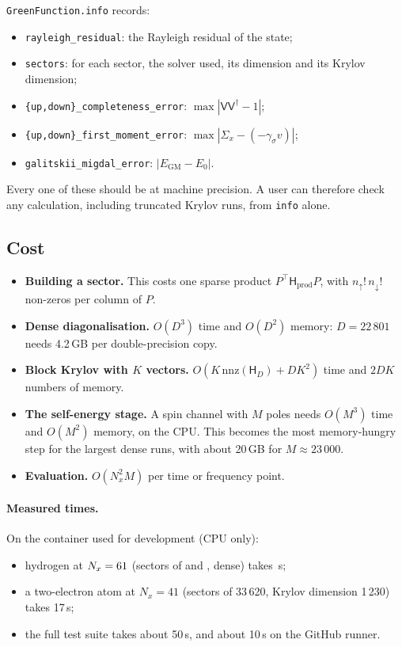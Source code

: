 \documentclass[11pt,a4paper]{article}
\newcommand{\code}[1]{\texttt{#1}}
\newcommand{\mat}[1]{\mathsf{#1}}
\newcommand{\Nx}{N_x}
\newcommand{\up}{{\uparrow}}
\newcommand{\dn}{{\downarrow}}
\begin{document}
\code{GreenFunction.info} records:
\begin{itemize}
\item \code{rayleigh\_residual}: the Rayleigh residual of the state;
\item \code{sectors}: for each sector, the solver used, its dimension and its Krylov dimension;
\item \code{\{up,down\}\_completeness\_error}: $\max|\mat V\mat V^\dagger-1|$;
\item \code{\{up,down\}\_first\_moment\_error}: $\max|\Sigma_x-(-\gamma_\sigma v)|$;
\item \code{galitskii\_migdal\_error}: $|E_\text{GM}-E_0|$.
\end{itemize}
Every one of these should be at machine precision. A user can therefore check any calculation, including truncated Krylov runs, from \code{info} alone.

\subsection{Cost}

\begin{itemize}
\item \textbf{Building a sector.} This costs one sparse product $P^\top\mat H_\text{prod}P$, with $n_\up!\,n_\dn!$ non-zeros per column of $P$.
\item \textbf{Dense diagonalisation.} $O(D^3)$ time and $O(D^2)$ memory: $D=22\,801$ needs 4.2\,GB per double-precision copy.
\item \textbf{Block Krylov with $K$ vectors.} $O(K\,\mathrm{nnz}(\mat H_D) + DK^2)$ time and $2DK$ numbers of memory.
\item \textbf{The self-energy stage.} A spin channel with $M$ poles needs $O(M^3)$ time and $O(M^2)$ memory, on the CPU. This becomes the most memory-hungry step for the largest dense runs, with about 20\,GB for $M\approx23\,000$.
\item \textbf{Evaluation.} $O(\Nx^2 M)$ per time or frequency point.
\end{itemize}

\paragraph{Measured times.} On the container used for development (CPU only):
\begin{itemize}
\item hydrogen at $\Nx=\valNx$ (sectors of \valDimUp{} and \valDimDown{}, dense) takes \valTimeExact\,s;
\item a two-electron atom at $\Nx=41$ (sectors of 33\,620, Krylov dimension 1\,230) takes 17\,s;
\item the full test suite takes about 50\,s, and about 10\,s on the GitHub runner.
\end{itemize}
\end{document}
